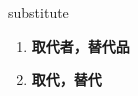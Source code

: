 
\begin{frame}
{\huge substitute}
\begin{center}
\begin{enumerate}\Large
  \item \textbf{取代者，替代品}
  \item \textbf{取代，替代}
\end{enumerate}
\end{center}
\end{frame}
